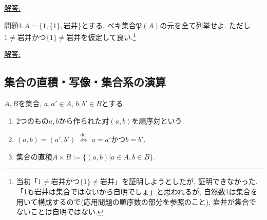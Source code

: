 \documentclass[dvipdfmx,a4paper,11pt]{article}
\theoremstyle{definition}
\begin{document}
\vspace{30pt}
  { \large \underline{解答: \hspace{13cm}}}
  
\vspace{30pt}
問題4.$A = \{ 1, \{1\}, \text{岩井}\}$とする. ベキ集合$\mathfrak{P}(A)$の元を全て列挙せよ. 
ただし$1 \neq\text{岩井}$かつ$\{ 1\} \neq \text{岩井}$を仮定して良い.\footnote{当初「$1 \neq\text{岩井}$かつ$\{ 1\} \neq \text{岩井}$」を証明しようとしたが, 証明できなかった. 「1も岩井は集合ではないから自明でしょ」と思われるが, 自然数1は集合を用いて構成するので(応用問題の順序数の部分を参照のこと), 岩井が集合でないことは自明ではない. }

\vspace{80pt}
  { \large \underline{解答: \hspace{13cm}}}
\newpage

 \begin{center}
\section{集合の直積・写像・集合系の演算}
\label{sec-2}
\end{center}


\begin{tcolorbox}[
    colback = white,
    colframe = black!35!black,
    fonttitle = \bfseries,
    breakable = true]
    $A,B$を集合, $a, a' \in A$, $b, b' \in B$とする. 
    \begin{enumerate}
    \setlength{\parskip}{0cm} 
  \setlength{\itemsep}{0cm} 
    \item 2つのもの$a,b$から作られた対$(a,b)$を順序対という. 
    \item $(a, b)=(a', b')$  $\stackrel{\mathrm{def}}{\Longleftrightarrow}$ $a=a'$かつ$b=b'$.
    \item 集合の直積$A \times B:= \{ (a,b) | a \in A, b \in B\}$.
    \end{enumerate}
 \end{tcolorbox}
 
\end{document}
